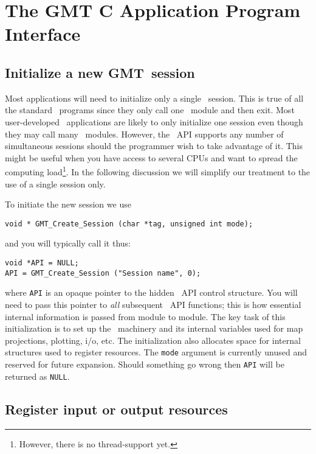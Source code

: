 \documentclass[11pt]{report}
\begin{document}
\chapter{The GMT C Application Program Interface}

\section{Initialize a new GMT\ session}

Most applications will need to initialize only a single \GMT\ session.  This is true of all
the standard \GMT\ programs since they only call one \GMT\ module and then exit.  Most
user-developed \GMT\ applications are likely to only initialize one session even though
they may call many \GMT\ modules.  However, the \GMT\ API supports any number of
simultaneous sessions should the programmer wish to take advantage of it.  This
might be useful when you have access to several CPUs and want to spread the computing
load\footnote{However, there is no thread-support yet.}.  In the following discussion we
will simplify our treatment to the use of a single session only.

To initiate the new session we use

\begin{verbatim}
void * GMT_Create_Session (char *tag, unsigned int mode);
\end{verbatim}
and you will typically call it thus:
\begin{verbatim}
void *API = NULL;
API = GMT_Create_Session ("Session name", 0);
\end{verbatim}
where \texttt{API} is an opaque pointer to the hidden \GMT\ API control structure.  You will need to
pass this pointer to \emph{all} subsequent \GMT\ API functions; this is how essential internal information
is passed from module to module.  The key task of this initialization
is to set up the \GMT\ machinery and its internal variables used for map projections, plotting, i/o,
etc.  The initialization also allocates space for internal structures used to register resources.
The \texttt{mode} argument is currently unused and reserved for future expansion. 
Should something go wrong then \texttt{API} will be returned as \texttt{NULL}.

\section{Register input or output resources}
\end{document}
